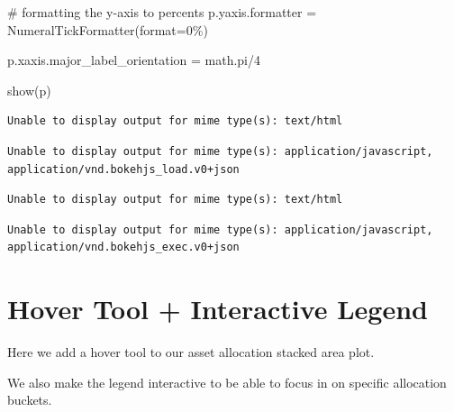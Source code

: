 \documentclass[
  letterpaper,
  DIV=11,
  numbers=noendperiod]{scrreprt}
\newenvironment{Shaded}{\begin{snugshade}}{\end{snugshade}}
\newcommand{\BuiltInTok}[1]{\textcolor[rgb]{0.00,0.23,0.31}{#1}}
\newcommand{\CommentTok}[1]{\textcolor[rgb]{0.37,0.37,0.37}{#1}}
\newcommand{\DecValTok}[1]{\textcolor[rgb]{0.68,0.00,0.00}{#1}}
\newcommand{\NormalTok}[1]{\textcolor[rgb]{0.00,0.23,0.31}{#1}}
\newcommand{\OperatorTok}[1]{\textcolor[rgb]{0.37,0.37,0.37}{#1}}
\newcommand{\StringTok}[1]{\textcolor[rgb]{0.13,0.47,0.30}{#1}}
\begin{document}
\begin{Shaded}
\begin{Highlighting}[]
\CommentTok{\# formatting the y{-}axis to percents}
\NormalTok{p.yaxis.formatter }\OperatorTok{=}\NormalTok{ NumeralTickFormatter(}\BuiltInTok{format}\OperatorTok{=}\StringTok{\textquotesingle{}0\%\textquotesingle{}}\NormalTok{)}

\NormalTok{p.xaxis.major\_label\_orientation }\OperatorTok{=}\NormalTok{ math.pi}\OperatorTok{/}\DecValTok{4}

\NormalTok{show(p)}
\end{Highlighting}
\end{Shaded}

\begin{verbatim}
Unable to display output for mime type(s): text/html
\end{verbatim}

\begin{verbatim}
Unable to display output for mime type(s): application/javascript, application/vnd.bokehjs_load.v0+json
\end{verbatim}

\begin{verbatim}
Unable to display output for mime type(s): text/html
\end{verbatim}

\begin{verbatim}
Unable to display output for mime type(s): application/javascript, application/vnd.bokehjs_exec.v0+json
\end{verbatim}

\hypertarget{hover-tool-interactive-legend}{%
\section{Hover Tool + Interactive
Legend}\label{hover-tool-interactive-legend}}

Here we add a hover tool to our asset allocation stacked area plot.

We also make the legend interactive to be able to focus in on specific
allocation buckets.
\end{document}
